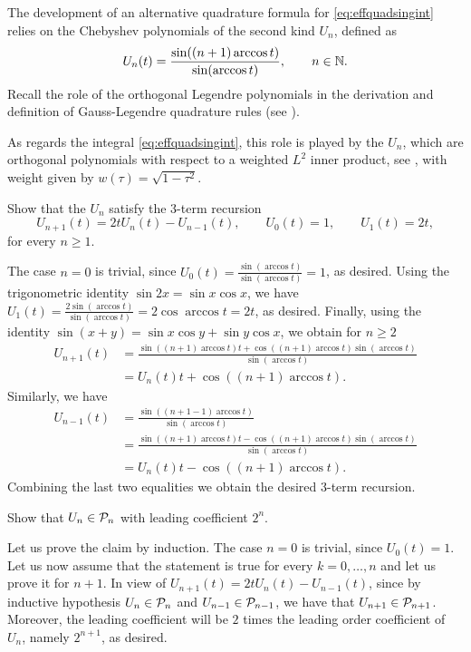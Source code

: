 \begin{problem}
The development of an alternative quadrature formula for \eqref{eq:effquadsingint} relies on the Chebyshev polynomials of the second kind $U_n$, defined as
\begin{equation*}
U_n(t)=\frac{\sin((n+1)\arccos t)}{\sin(\arccos t)}, \qquad n\in\mathbb{N}.
\end{equation*}
Recall the role of the orthogonal Legendre polynomials in the derivation and definition of Gauss-Legendre quadrature rules (see ).

As regards the integral \eqref{eq:effquadsingint}, this role is played by the $U_n$, which are orthogonal polynomials with respect to a weighted $L^2$ inner product, see , with weight given by $w(\tau)=\sqrt{1-\tau^2}$.
\begin{subproblem}[2]
Show that the $U_n$ satisfy the 3-term recursion
\[
U_{n+1}(t)=2tU_n(t)-U_{n-1}(t),\qquad U_0(t)=1,\qquad U_1(t)=2t,
\]
for every $n\ge 1$.
\begin{solution}
The case $n=0$ is trivial, since $U_0(t)=\frac{\sin(\arccos t)}{\sin(\arccos t)}=1$, as desired. Using the trigonometric identity $\sin 2x = \sin x \cos x$, we have $U_1(t)=\frac{2\sin(\arccos t)}{\sin(\arccos t)}=2\cos \arccos t = 2t$, as desired. Finally, using the identity $\sin (x+y) = \sin x \cos y + \sin y \cos x$, we obtain for $n\ge 2$
\[
\begin{split}
U_{n+1}(t)   &= \frac{\sin((n+1)\arccos t)t + \cos((n+1)\arccos t) \sin (\arccos t)}{\sin(\arccos t)} \\
& = U_n(t) t+\cos((n+1)\arccos t).
\end{split}
\]
Similarly, we have
\[
\begin{split}
U_{n-1}(t)&=\frac{\sin((n+1 -1 )\arccos t)}{\sin(\arccos t)} \\ 
&= \frac{\sin((n+1)\arccos t)t - \cos((n+1)\arccos t) \sin (\arccos t)}{\sin(\arccos t)}\\
& = U_n(t) t-\cos((n+1)\arccos t).
\end{split}
\]
Combining the last two equalities we obtain the desired 3-term recursion.
\end{solution}
\end{subproblem}

\begin{subproblem}[1]
Show that $U_n\in {\cal P}_{n}$ with leading coefficient $2^n$.
\begin{solution}
Let us prove the claim by induction. The case $n=0$ is trivial, since $U_0(t)=1$. Let us now assume that the statement is true for every $k=0,\dots,n$ and let us prove it for $n+1$. In view of $U_{n+1}(t)=2tU_n(t)-U_{n-1}(t)$, since by inductive hypothesis $U_n\in{\cal P}_{n}$ and $U_{n-1}\in{\cal P}_{n-1}$, we have that $U_{n+1}\in {\cal P}_{{n+1}}$. Moreover, the leading coefficient will be $2$ times the leading order coefficient of $U_n$, namely $2^{n+1}$, as desired.
\end{solution}
\end{subproblem}


\end{problem}
